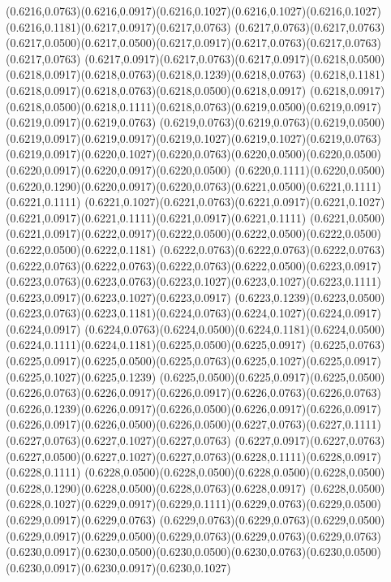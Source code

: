(0.6216,0.0763)(0.6216,0.0917)(0.6216,0.1027)(0.6216,0.1027)(0.6216,0.1027)(0.6216,0.1181)(0.6217,0.0917)(0.6217,0.0763)
(0.6217,0.0763)(0.6217,0.0763)(0.6217,0.0500)(0.6217,0.0500)(0.6217,0.0917)(0.6217,0.0763)(0.6217,0.0763)(0.6217,0.0763)
(0.6217,0.0917)(0.6217,0.0763)(0.6217,0.0917)(0.6218,0.0500)(0.6218,0.0917)(0.6218,0.0763)(0.6218,0.1239)(0.6218,0.0763)
(0.6218,0.1181)(0.6218,0.0917)(0.6218,0.0763)(0.6218,0.0500)(0.6218,0.0917)
\PST@Solid(0.6218,0.0917)(0.6218,0.0500)(0.6218,0.1111)(0.6218,0.0763)(0.6219,0.0500)(0.6219,0.0917)(0.6219,0.0917)(0.6219,0.0763)
(0.6219,0.0763)(0.6219,0.0763)(0.6219,0.0500)(0.6219,0.0917)(0.6219,0.0917)(0.6219,0.1027)(0.6219,0.1027)(0.6219,0.0763)
(0.6219,0.0917)(0.6220,0.1027)(0.6220,0.0763)(0.6220,0.0500)(0.6220,0.0500)(0.6220,0.0917)(0.6220,0.0917)(0.6220,0.0500)
(0.6220,0.1111)(0.6220,0.0500)(0.6220,0.1290)(0.6220,0.0917)(0.6220,0.0763)(0.6221,0.0500)(0.6221,0.1111)(0.6221,0.1111)
(0.6221,0.1027)(0.6221,0.0763)(0.6221,0.0917)(0.6221,0.1027)(0.6221,0.0917)(0.6221,0.1111)(0.6221,0.0917)(0.6221,0.1111)
(0.6221,0.0500)(0.6221,0.0917)(0.6222,0.0917)(0.6222,0.0500)(0.6222,0.0500)(0.6222,0.0500)(0.6222,0.0500)(0.6222,0.1181)
(0.6222,0.0763)(0.6222,0.0763)(0.6222,0.0763)(0.6222,0.0763)(0.6222,0.0763)(0.6222,0.0763)(0.6222,0.0500)(0.6223,0.0917)
(0.6223,0.0763)(0.6223,0.0763)(0.6223,0.1027)(0.6223,0.1027)(0.6223,0.1111)(0.6223,0.0917)(0.6223,0.1027)(0.6223,0.0917)
(0.6223,0.1239)(0.6223,0.0500)(0.6223,0.0763)(0.6223,0.1181)(0.6224,0.0763)(0.6224,0.1027)(0.6224,0.0917)(0.6224,0.0917)
(0.6224,0.0763)(0.6224,0.0500)(0.6224,0.1181)(0.6224,0.0500)(0.6224,0.1111)(0.6224,0.1181)(0.6225,0.0500)(0.6225,0.0917)
(0.6225,0.0763)(0.6225,0.0917)(0.6225,0.0500)(0.6225,0.0763)(0.6225,0.1027)(0.6225,0.0917)(0.6225,0.1027)(0.6225,0.1239)
(0.6225,0.0500)(0.6225,0.0917)(0.6225,0.0500)(0.6226,0.0763)(0.6226,0.0917)(0.6226,0.0917)(0.6226,0.0763)(0.6226,0.0763)
(0.6226,0.1239)(0.6226,0.0917)(0.6226,0.0500)(0.6226,0.0917)(0.6226,0.0917)
\PST@Solid(0.6226,0.0917)(0.6226,0.0500)(0.6226,0.0500)(0.6227,0.0763)(0.6227,0.1111)(0.6227,0.0763)(0.6227,0.1027)(0.6227,0.0763)
(0.6227,0.0917)(0.6227,0.0763)(0.6227,0.0500)(0.6227,0.1027)(0.6227,0.0763)(0.6228,0.1111)(0.6228,0.0917)(0.6228,0.1111)
(0.6228,0.0500)(0.6228,0.0500)(0.6228,0.0500)(0.6228,0.0500)(0.6228,0.1290)(0.6228,0.0500)(0.6228,0.0763)(0.6228,0.0917)
(0.6228,0.0500)(0.6228,0.1027)(0.6229,0.0917)(0.6229,0.1111)(0.6229,0.0763)(0.6229,0.0500)(0.6229,0.0917)(0.6229,0.0763)
(0.6229,0.0763)(0.6229,0.0763)(0.6229,0.0500)(0.6229,0.0917)(0.6229,0.0500)(0.6229,0.0763)(0.6229,0.0763)(0.6229,0.0763)
(0.6230,0.0917)(0.6230,0.0500)(0.6230,0.0500)(0.6230,0.0763)(0.6230,0.0500)(0.6230,0.0917)(0.6230,0.0917)(0.6230,0.1027)
